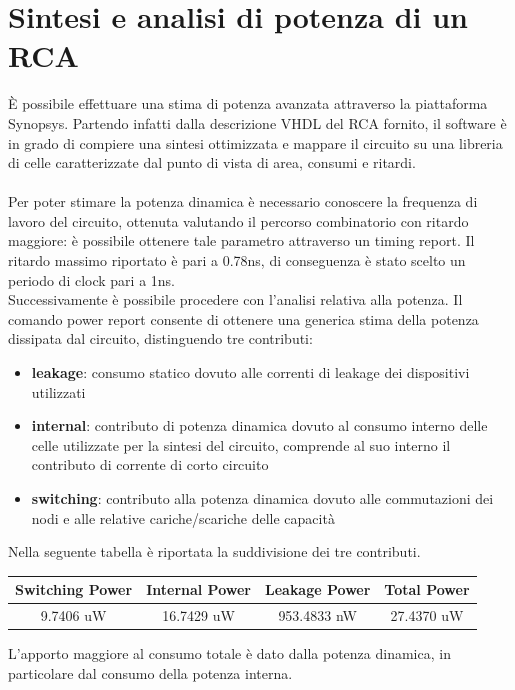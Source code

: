 \documentclass[11pt,  english, makeidx, a4paper, titlepage, oneside]{book}
\begin{document}
\section{Sintesi e analisi di potenza di un RCA}
È possibile effettuare una stima di potenza avanzata attraverso la piattaforma Synopsys. 
Partendo infatti dalla descrizione VHDL del RCA fornito, il software è in grado di compiere una sintesi ottimizzata e mappare il circuito su una libreria di celle caratterizzate dal punto di vista di area, consumi e ritardi.
\\\\
Per poter stimare la potenza dinamica è necessario conoscere la frequenza di lavoro del circuito, ottenuta valutando il percorso combinatorio con ritardo maggiore: è possibile ottenere tale parametro attraverso un timing report.
Il ritardo massimo riportato è pari a 0.78ns, di conseguenza è stato scelto un periodo di clock pari a 1ns.\\
Successivamente è possibile procedere con l'analisi relativa alla potenza.
Il comando power report consente di ottenere una generica stima della potenza dissipata dal circuito, distinguendo tre contributi:
\begin{itemize}
\item \textbf{leakage}: consumo statico dovuto alle correnti di leakage dei dispositivi utilizzati
\item \textbf{internal}: contributo di potenza dinamica dovuto al consumo interno delle celle utilizzate per la sintesi del circuito, comprende al suo interno il contributo di corrente di corto circuito
\item \textbf{switching}: contributo alla potenza dinamica dovuto alle commutazioni dei nodi e alle relative cariche/scariche delle capacità
\end{itemize}
Nella seguente tabella è riportata la suddivisione dei tre contributi.
\\
\begin{center}
	\begin{tabular}{|c|c|c|c|}
	\hline
	Switching Power & Internal Power & Leakage Power & Total Power \\ 
	\hline
	9.7406 uW & 16.7429 uW & 953.4833 nW & 27.4370 uW \\
	\hline
	\end{tabular}
\end{center}
\vspace{0.3cm}
L'apporto maggiore al consumo totale è dato dalla potenza dinamica, in particolare dal consumo della potenza interna.\\
\end{document}

